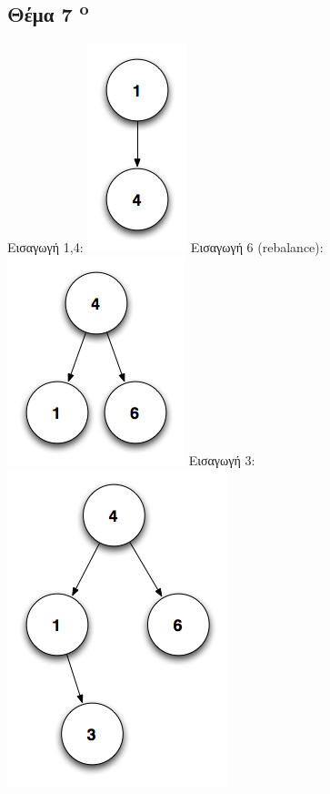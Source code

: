 \documentclass[a4paper,10pt]{article}
\begin{document}
\subsection{Θέμα 7 \textsuperscript{o}}
Εισαγωγή 1,4:
\includegraphics[scale=0.3]{files/im1_4.png}
Εισαγωγή 6 (rebalance):
\includegraphics[scale=0.3]{files/im2_6.png}
Εισαγωγή 3:
\includegraphics[scale=0.3]{files/im3_3.png}
\end{document}
